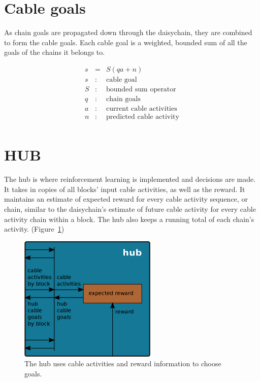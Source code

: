 \documentclass[oneside,twocolumn]{article}
\begin{document}
\section*{\color{copper} Cable goals}

As chain goals are propagated down through the daisychain, they are combined to form the cable goals. Each cable goal is a weighted, bounded sum of all the goals of the chains it belongs to.

\begin{eqnarray*}
s &= &  S(qa + n) \\
s &:& \mbox{cable goal} \\
S &:& \mbox{bounded sum operator} \\
q &:& \mbox{chain goals} \\
a &:& \mbox{current cable activities} \\
n &:& \mbox{predicted cable activity} \\
\end{eqnarray*}

\section*{\color{copper} HUB}

The hub is where reinforcement learning is implemented and decisions are made. It takes in copies of all blocks' input cable activities, as well as the reward. It maintains an estimate of expected reward for every cable activity sequence, or chain, similar to the daisychain's estimate of future cable activity for every cable activity chain within a block. The hub also keeps a running total of each chain's activity. (Figure~\ref{hub})  

\begin{figure}[ht]
\centering
\includegraphics[height=6.0cm]{figs/hub.png}
\caption{The hub uses cable activities and reward information to choose goals.}
\label{hub}
\end{figure}
\end{document}
